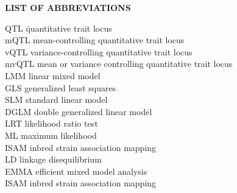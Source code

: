 {}

\begin{center}
{\Large \textbf{LIST OF ABBREVIATIONS}}
\end{center}

\newcommand{\Ab}[2]{\noindent  #1 \> #2 \\}
\newcommand{\Abi}[2]{\noindent #1 \hspace{1.5cm} \= #2 \\}

\begin{tabbing}
\Abi{QTL}{quantitative trait locus}
\Ab{mQTL}{mean-controlling quantitative trait locus}
\Ab{vQTL}{variance-controlling quantitative trait locus}
\Ab{mvQTL}{mean or variance controlling quantitative trait locus}
\Ab{LMM}{linear mixed model}
\Ab{GLS}{generalized least squares}
\Ab{SLM}{standard linear model}
\Ab{DGLM}{double generalized linear model}
\Ab{LRT}{likelihood ratio test}
\Ab{ML}{maximum likelihood}
\Ab{ISAM}{inbred strain association mapping}
\Ab{LD}{linkage disequilibrium}
\Ab{EMMA}{efficient mixed model analysis}
\Ab{ISAM}{inbred strain association mapping}
\end{tabbing}

\clearpage
